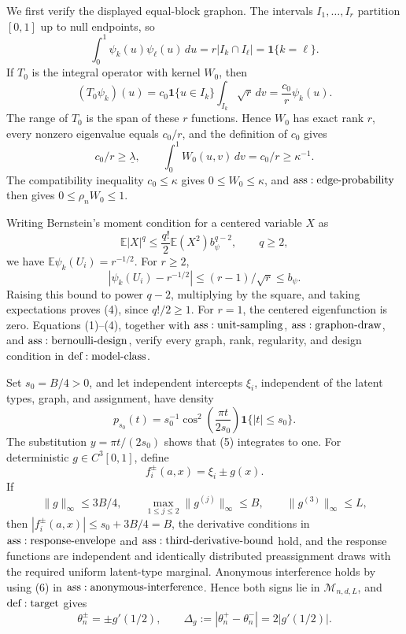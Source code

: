 We first verify the displayed equal-block graphon.  The intervals \(I_1,\ldots,I_r\) partition \([0,1]\) up to null endpoints, so
\[
 \int_0^1\psi_k(u)\psi_\ell(u)\,du
 =r|I_k\cap I_\ell|=\mathbf1\{k=\ell\}.
\tag{1}
\]
If \(T_0\) is the integral operator with kernel \(W_0\), then
\[
 (T_0\psi_k)(u)
 =c_0\mathbf1\{u\in I_k\}\int_{I_k}\sqrt r\,dv
 =\frac{c_0}{r}\psi_k(u).
\tag{2}
\]
The range of \(T_0\) is the span of these \(r\) functions.  Hence \(W_0\) has exact rank \(r\), every nonzero eigenvalue equals \(c_0/r\), and the definition of \(c_0\) gives
\[
 c_0/r\geq\underline\lambda,
 \qquad \int_0^1W_0(u,v)\,dv=c_0/r\geq\kappa^{-1}.
\tag{3}
\]
The compatibility inequality \(c_0\leq\kappa\) gives \(0\leq W_0\leq\kappa\), and \({\rm ass:edge\text{-}probability}\) then gives \(0\leq\rho_nW_0\leq1\).

Writing Bernstein's moment condition for a centered variable \(X\) as
\[
 \mathbb E|X|^q\leq\frac{q!}{2}\mathbb E(X^2)b_\psi^{q-2},
 \qquad q\geq2,
\tag{4}
\]
we have \(\mathbb E\psi_k(U_i)=r^{-1/2}\).  For \(r\geq2\),
\[
 |\psi_k(U_i)-r^{-1/2}|
 \leq(r-1)/\sqrt r\leq b_\psi.
\]
Raising this bound to power \(q-2\), multiplying by the square, and taking expectations proves (4), since \(q!/2\geq1\).  For \(r=1\), the centered eigenfunction is zero.  Equations (1)--(4), together with \({\rm ass:unit\text{-}sampling}\), \({\rm ass:graphon\text{-}draw}\), and \({\rm ass:bernoulli\text{-}design}\), verify every graph, rank, regularity, and design condition in \({\rm def:model\text{-}class}\).

Set \(s_0=B/4>0\), and let independent intercepts \(\xi_i\), independent of the latent types, graph, and assignment, have density
\[
 p_{s_0}(t)=s_0^{-1}\cos^2\!\left(\frac{\pi t}{2s_0}\right)
 \mathbf1\{|t|\leq s_0\}.
\tag{5}
\]
The substitution \(y=\pi t/(2s_0)\) shows that (5) integrates to one.  For deterministic \(g\in C^3[0,1]\), define
\[
 f_i^\pm(a,x)=\xi_i\pm g(x).
\tag{6}
\]
If
\[
 \|g\|_\infty\leq3B/4,
 \qquad \max_{1\leq j\leq2}\|g^{(j)}\|_\infty\leq B,
 \qquad \|g^{(3)}\|_\infty\leq L,
\tag{7}
\]
then \(|f_i^\pm(a,x)|\leq s_0+3B/4=B\), the derivative conditions in \({\rm ass:response\text{-}envelope}\) and \({\rm ass:third\text{-}derivative\text{-}bound}\) hold, and the response functions are independent and identically distributed preassignment draws with the required uniform latent-type marginal.  Anonymous interference holds by using (6) in \({\rm ass:anonymous\text{-}interference}\).  Hence both signs lie in \(\mathcal M_{n,d,L}\), and \({\rm def:target}\) gives
\[
 \theta_n^\pm=\pm g'(1/2),
 \qquad \Delta_g:=|\theta_n^+-\theta_n^-|=2|g'(1/2)|.
\tag{8}
\]

